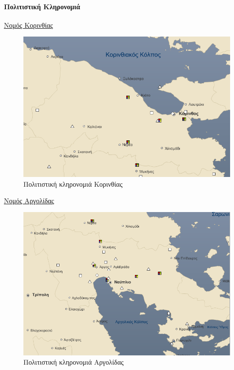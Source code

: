 \documentclass[12pt]{article}
\begin{document}
	\paragraph{Πολιτιστική Κληρονομιά}
	
	\underline{Νομός Κορινθίας}
	
	\begin{figure} [H]
		\begin{center}
			\includegraphics [scale = 0.60] {korinthia2.png}
			\caption{Πολιτιστική κληρονομιά Κορινθίας}
		\end{center}
	\end{figure}

	\underline{Νομός Αργολίδας}
	
	\begin{figure} [H]
		\begin{center}
			\includegraphics [scale = 0.60] {argolida2.png}
			\caption{Πολιτιστική κληρονομιά Αργολίδας}
		\end{center}
	\end{figure}
	
\end{document}
